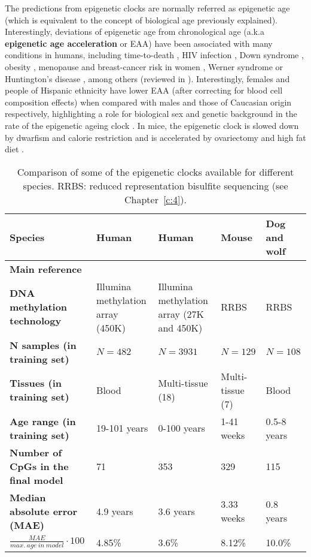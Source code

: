 The predictions from epigenetic clocks are normally referred as epigenetic age (which is equivalent to the concept of biological age previously explained). Interestingly, deviations of epigenetic age from chronological age (a.k.a \textbf{epigenetic age acceleration} or \acrshort{EAA}) have been associated with many conditions in humans, including time-to-death \citep{Chen2016,Marioni2015}, HIV infection \citep{Horvath2015b}, Down syndrome \citep{Horvath2015a}, obesity \citep{Horvath2014}, menopause \citep{Levine2016} and breast-cancer risk in women \citep{Kresovich2019}, Werner syndrome \citep{Maierhofer2017} or Huntington’s disease \citep{Horvath2016a}, among others (reviewed in \citet{Horvath2018}). Interestingly, females and people of Hispanic ethnicity have lower \acrshort{EAA} (after correcting for blood cell composition effects) when compared with males and those of Caucasian origin respectively, highlighting a role for biological sex and genetic background in the rate of the epigenetic ageing clock \citep{Horvath2016}. In mice, the epigenetic clock is slowed down by dwarfism and calorie restriction \citep{Wang2017,Cole2017,Petkovich2017,Thompson2018,Meer2018} and is accelerated by ovariectomy and high fat diet \citep{Wang2017,Stubbs2017, Petkovich2017,Thompson2018}. 

\bigskip

\begin{table}
	\begin{tabular}{p{3.5cm} | p{2.5cm} p{2.5cm} p{2.5cm} p{2.5cm}}
		\toprule 
		\textbf{Species} & Human & Human & Mouse & Dog and wolf \\
		\midrule
		\textbf{Main reference} & \citet{Hannum2013} & \citet{Horvath2013} & \citet{Stubbs2017} & \citet{Thompson2017} \\
		\midrule
		\textbf{DNA methylation technology} & Illumina methylation array (450K) & Illumina methylation array (27K and 450K) & RRBS & RRBS \\
		\midrule
		\textbf{N samples (in training set)} & $N=482$ & $N=3931$ & $N=129$ & $N=108$ \\
		\midrule
		\textbf{Tissues (in training set)} & Blood & Multi-tissue (18) & Multi-tissue (7) & Blood \\
		\midrule
		\textbf{Age range (in training set)} & 19-101 years & 0-100 years & 1-41 weeks & 0.5-8 years \\
		\midrule
		\textbf{Number of CpGs in the final model} & 71 & 353 & 329 & 115 \\
		\midrule
		\textbf{Median absolute error (\acrshort{MAE})} & 4.9 years & 3.6 years & 3.33 weeks & 0.8 years \\
		\midrule
		$\frac{MAE}{max.\ age\ in\ model} \cdot 100$ & 4.85\% & 3.6\% & 8.12\% & 10.0\% \\    
		\bottomrule 
	\end{tabular}
	\vspace*{3mm}
	\caption[Comparison of epigenetic clocks in different species]{Comparison of some of the epigenetic clocks available for different species. \acrshort{RRBS}: reduced representation bisulfite sequencing (see Chapter~\ref{c:4}).}
	\label{tab:clocks}
\end{table}  


